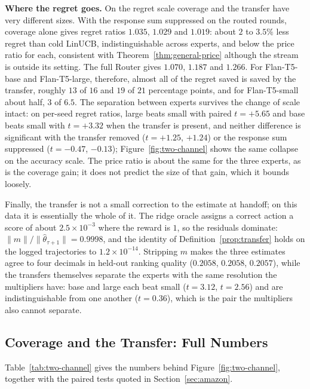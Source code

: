 \documentclass{article}
\theoremstyle{definition}
\theoremstyle{remark}
\theoremstyle{remark}
\begin{document}
\textbf{Where the regret goes.} On the regret scale coverage and the transfer
have very different sizes. With the response sum suppressed on the routed
rounds, coverage alone gives regret ratios $1.035$, $1.029$ and $1.019$:
about $2$ to $3.5\%$ less regret than cold LinUCB, indistinguishable across
experts, and below the price ratio for each, consistent with
Theorem~\ref{thm:general-price} although the stream is outside its setting.
The full Router gives $1.070$, $1.187$ and $1.266$. For Flan-T5-base and
Flan-T5-large, therefore, almost all of the regret saved is saved by the
transfer, roughly $13$ of $16$ and $19$ of $21$ percentage points, and for
Flan-T5-small about half, $3$ of $6.5$. The separation between experts
survives the change of scale intact: on per-seed regret ratios, large beats
small with paired $t=+5.65$ and base beats small with $t=+3.32$ when the
transfer is present, and neither difference is significant with the transfer
removed ($t=+1.25$, $+1.24$) or the response sum suppressed ($t=-0.47$,
$-0.13$); Figure~\ref{fig:two-channel} shows the same
collapse on the accuracy scale. The price ratio is about the same for the
three experts, as is the coverage gain; it does not predict the size of that
gain, which it bounds loosely.

Finally, the transfer is not a small correction to the estimate at handoff; on
this data it is essentially the whole of it. The ridge oracle assigns a
correct action a score of about $2.5\times10^{-3}$ where the reward is $1$, so
the residuals dominate: $\|m\|/\|\widehat\theta_{\tau+1}\|=0.9998$, and the
identity of Definition~\ref{prop:transfer} holds on the logged trajectories
to $1.2\times10^{-14}$. Stripping $m$ makes the three estimates agree to four
decimals in held-out ranking quality ($0.2058$, $0.2058$, $0.2057$), while the
transfers themselves separate the experts with the same resolution the
multipliers have: base and large each beat small ($t=3.12$, $t=2.56$) and are
indistinguishable from one another ($t=0.36$), which is the pair the
multipliers also cannot separate.

\subsection{Coverage and the Transfer: Full Numbers}
\label{app:two-channel}

Table~\ref{tab:two-channel} gives the numbers behind
Figure~\ref{fig:two-channel}, together with the paired tests quoted in
Section~\ref{sec:amazon}.
\end{document}
